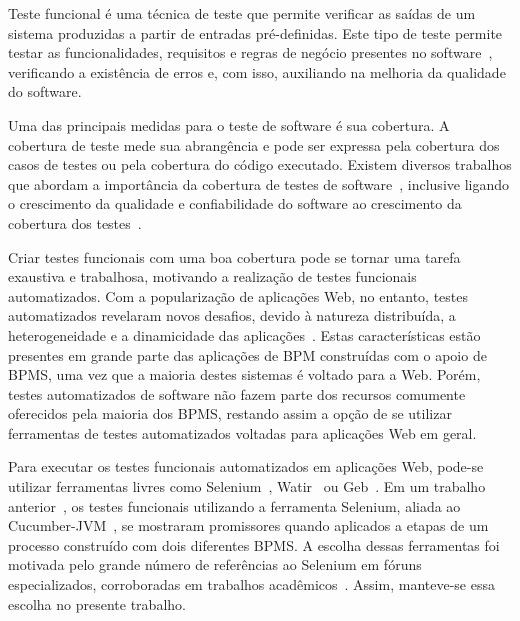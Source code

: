 \documentclass[12pt]{article}
\begin{document}
Teste funcional é uma técnica de teste que permite verificar as saídas de um sistema produzidas a partir de entradas pré-definidas. Este tipo de teste permite testar as funcionalidades, requisitos e regras de negócio presentes no software~\cite{Delamaro:2007}, verificando a existência de erros e, com isso, auxiliando na melhoria da qualidade do software.

Uma das principais medidas para o teste de software é sua cobertura. A cobertura de teste mede sua abrangência e pode ser expressa pela cobertura dos casos de testes ou pela cobertura do código executado. Existem diversos trabalhos que abordam a importância da cobertura de testes de software~\cite{sun2016model,rayadurgam2001coverage,zhu1997software, bieman1996using}, inclusive ligando o crescimento da qualidade e confiabilidade do software ao crescimento da cobertura dos testes~\cite{malaiya2002software}.





Criar testes funcionais com uma boa cobertura pode se tornar uma tarefa exaustiva e trabalhosa, motivando a realização de testes funcionais automatizados. Com a popularização de aplicações Web, no entanto, testes automatizados revelaram novos desafios, devido à natureza distribuída, a heterogeneidade e a dinamicidade das aplicações~\cite{webtest:2013}. Estas características estão presentes em grande parte das aplicações de BPM construídas com o apoio de BPMS, uma vez que a maioria destes sistemas é voltado para a Web. Porém, testes automatizados de software não fazem parte dos recursos comumente oferecidos pela maioria dos BPMS, restando assim a opção de se utilizar ferramentas de testes automatizados voltadas para aplicações Web em geral.

Para executar os testes funcionais automatizados em aplicações Web, pode-se utilizar ferramentas livres como Selenium~\cite{selenium}, Watir~\cite{watir} ou Geb~\cite{geb}. Em um trabalho anterior~\cite{sbqs2015}, os testes funcionais utilizando a ferramenta Selenium, aliada ao Cucumber-JVM~\cite{cucumber}, se mostraram promissores quando aplicados a etapas de um processo construído com dois diferentes BPMS. A escolha dessas ferramentas foi motivada pelo grande número de referências ao Selenium em fóruns especializados, corroboradas em trabalhos acadêmicos~\cite{sbqs2013, sbqs2015:compara}. Assim, manteve-se essa escolha no presente trabalho.
\end{document}
